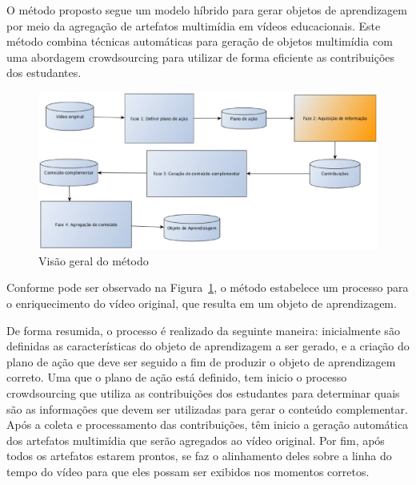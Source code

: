 O método proposto segue um modelo híbrido para gerar objetos de aprendizagem por meio da agregação de artefatos multimídia em vídeos educacionais. Este método combina técnicas automáticas para geração de objetos multimídia com uma abordagem crowdsourcing para utilizar de forma eficiente as contribuições dos estudantes.

\begin{figure}[ht]
\centering
\includegraphics[width=.99\textwidth]{imagens/metodo/geral_oa.eps}
\caption{Visão geral do método}
\label{fig:metodo:geral}
\end{figure}


Conforme pode ser observado na Figura~\ref{fig:metodo:geral}, o método estabelece um processo para o enriquecimento do vídeo original, que resulta em um objeto de aprendizagem.

De forma resumida, o processo é realizado da seguinte maneira: inicialmente são definidas as características do objeto de aprendizagem a ser gerado, e a criação do plano de ação que deve ser seguido a fim de produzir o objeto de aprendizagem correto. Uma que o plano de ação está definido, tem inicio o processo crowdsourcing que utiliza as contribuições dos estudantes para determinar quais são as informações que devem ser utilizadas para gerar o conteúdo complementar. Após a coleta e processamento das contribuições, têm inicio a geração automática dos artefatos multimídia que serão agregados ao vídeo original. Por fim, após todos os artefatos estarem prontos, se faz o alinhamento deles sobre a linha do tempo do vídeo para que eles possam ser exibidos nos momentos corretos.










